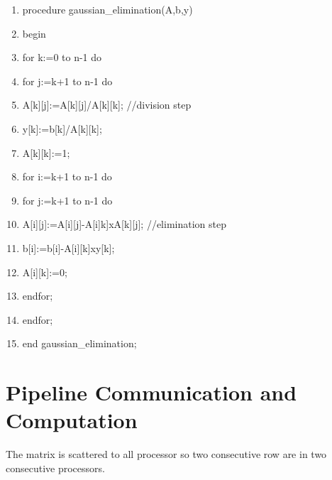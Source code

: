 \documentclass[a4paper]{article}
\begin{document}
\begin{enumerate}
\item procedure gaussian\_elimination(A,b,y)

\item begin

\item \qquad for k:=0 to n-1 do

\item \qquad \qquad for j:=k+1 to n-1 do

\item \qquad \qquad \qquad A[k][j]:=A[k][j]/A[k][k]; //division step

\item \qquad \qquad y[k]:=b[k]/A[k][k];

\item \qquad \qquad A[k][k]:=1;

\item \qquad \qquad for i:=k+1 to n-1 do

\item \qquad \qquad \qquad for j:=k+1 to n-1 do

\item \qquad \qquad \qquad \qquad A[i][j]:=A[i][j]-A[i]k]xA[k][j];
//elimination step

\item \qquad \qquad \qquad b[i]:=b[i]-A[i][k]xy[k];

\item \qquad \qquad \qquad A[i][k]:=0;

\item \qquad \qquad endfor;

\item \qquad endfor;

\item end gaussian\_elimination;
\end{enumerate}

\section{\protect\bigskip Pipeline Communication and Computation}

\bigskip The matrix is scattered to all processor so two consecutive row are
in two consecutive processors.
\end{document}
